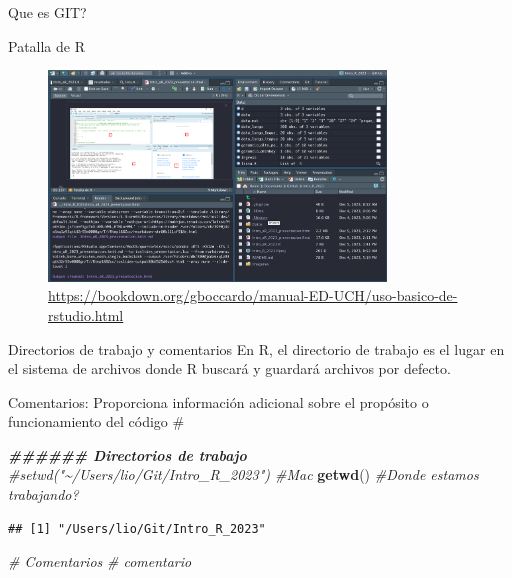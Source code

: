 \documentclass[
  ignorenonframetext,
]{beamer}
\newenvironment{Shaded}{\begin{snugshade}}{\end{snugshade}}
\newcommand{\CommentTok}[1]{\textcolor[rgb]{0.56,0.35,0.01}{\textit{#1}}}
\newcommand{\DocumentationTok}[1]{\textcolor[rgb]{0.56,0.35,0.01}{\textbf{\textit{#1}}}}
\newcommand{\FunctionTok}[1]{\textcolor[rgb]{0.13,0.29,0.53}{\textbf{#1}}}
\newcommand{\NormalTok}[1]{#1}
\begin{document}
\begin{frame}[fragile]{Que es GIT?}
\begin{block}{Patalla de R}
\protect\hypertarget{patalla-de-r}{}
\begin{figure}
\hypertarget{id}{%
\centering
\includegraphics[width=0.8\textwidth,height=0.8\textheight]{Imagenes/RStudio-pantalla.png}
\caption{\url{https://bookdown.org/gboccardo/manual-ED-UCH/uso-basico-de-rstudio.html}}\label{id}
}
\end{figure}
\end{block}

\begin{block}{Directorios de trabajo \textbar{} y comentarios}
\protect\hypertarget{directorios-de-trabajo-y-comentarios}{}
En R, el directorio de trabajo es el lugar en el sistema de archivos
donde R buscará y guardará archivos por defecto.

Comentarios: Proporciona información adicional sobre el propósito o
funcionamiento del código \#

\begin{Shaded}
\begin{Highlighting}[]
\DocumentationTok{\#\#\#\#\#\# Directorios de trabajo}
\CommentTok{\#setwd("\textasciitilde{}/Users/lio/Git/Intro\_R\_2023")  \#Mac}
\FunctionTok{getwd}\NormalTok{() }\CommentTok{\#Donde estamos trabajando?}
\end{Highlighting}
\end{Shaded}

\begin{verbatim}
## [1] "/Users/lio/Git/Intro_R_2023"
\end{verbatim}

\begin{Shaded}
\begin{Highlighting}[]
\CommentTok{\# Comentarios}
\CommentTok{\# comentario}
\end{Highlighting}
\end{Shaded}
\end{block}
\end{frame}
\end{document}
